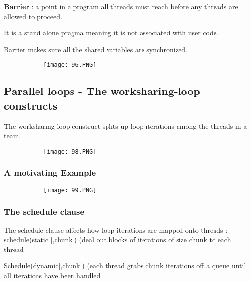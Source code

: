 \documentclass{article}
\begin{document}
\textbf{Barrier} : a point in a program all threads must reach before any threads are allowed to proceed.

It is a stand alone pragma meaning it is not associated with user code. 

Barrier makes sure all the shared variables are synchronized.


\begin{figure}[ht!]
  \centering
  \begin{subfigure}[b]{0.5\linewidth}
    \texttt{[image: 96.PNG]}
  \end{subfigure}
\end{figure}


\vspace{40mm}

\subsection{Parallel loops - The worksharing-loop constructs}

The worksharing-loop construct splits up loop iterations among the threads in a team.

\begin{figure}[ht!]
  \centering
  \begin{subfigure}[b]{0.5\linewidth}
    \texttt{[image: 98.PNG]}
  \end{subfigure}
\end{figure}

\subsubsection{A motivating Example}

\begin{figure}[ht!]
  \centering
  \begin{subfigure}[b]{0.5\linewidth}
    \texttt{[image: 99.PNG]}
  \end{subfigure}
\end{figure}

\subsubsection{The schedule clause}

The schedule clause affects how loop iterations are mapped onto threads : schedule(static [,chunk]) (deal out blocks of iterations of size chunk to each thread

Schedule(dynamic[,chunk]) (each thread grabs chunk iterations off a queue until all iterations have been handled
\end{document}

